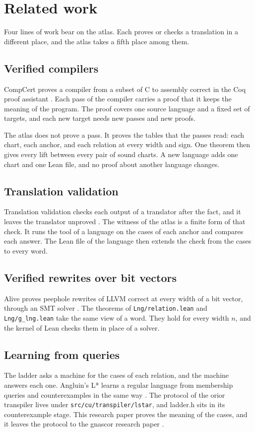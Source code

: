 \chapter{Related work}
\label{ch:related}

Four lines of work bear on the atlas. Each proves or checks a translation in a different place, and the atlas takes
a fifth place among them.

\section{Verified compilers}

CompCert proves a compiler from a subset of C to assembly correct in the Coq proof assistant \cite{src:compcert}.
Each pass of the compiler carries a proof that it keeps the meaning of the program. The proof covers one source
language and a fixed set of targets, and each new target needs new passes and new proofs.

The atlas does not prove a pass. It proves the tables that the passes read: each chart, each anchor, and each
relation at every width and sign. One theorem then gives every lift between every pair of sound charts. A new
language adds one chart and one Lean file, and no proof about another language changes.

\section{Translation validation}

Translation validation checks each output of a translator after the fact, and it leaves the translator unproved
\cite{src:validation}. The witness of the atlas is a finite form of that check. It runs the tool of a language on
the cases of each anchor and compares each answer. The Lean file of the language then extends the check from the
cases to every word.

\section{Verified rewrites over bit vectors}

Alive proves peephole rewrites of LLVM correct at every width of a bit vector, through an SMT solver
\cite{src:alive}. The theorems of \texttt{Lng/relation.lean} and \texttt{Lng/g\_lng.lean} take the same view of a
word. They hold for every width $n$, and the kernel of Lean checks them in place of a solver.

\section{Learning from queries}

The ladder asks a machine for the cases of each relation, and the machine answers each one. Angluin's L* learns a
regular language from membership queries and counterexamples in the same way \cite{src:angluin}. The protocol of
the orior transpiler lives under \texttt{src/cu/transpiler/lstar}, and ladder.h sits in its counterexample stage.
This research paper proves the meaning of the cases, and it leaves the protocol to the gnascor research paper
\cite{src:gnascor}.
